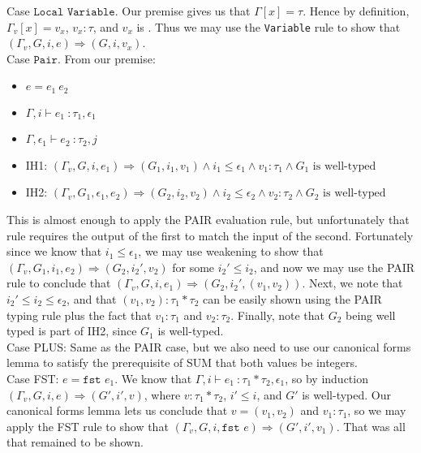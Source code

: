 \documentclass{article}
\begin{document}
Case $\texttt{Local Variable}$. Our premise gives us that $\Gamma[x] = \tau$. Hence by definition, $\Gamma_v[x] = v_x$, $v_x : \tau$, and $v_x$ is \okvalue. Thus we may use the \texttt{Variable} rule to show that $(\Gamma_v, G, i, e) \Rightarrow (G, i, v_x)$.
\\

Case $\texttt{Pair}$. 
From our premise:
\begin{itemize}
	\item $e = e_1\ e_2$
	\item $\Gamma, i \vdash e_1\ \colon \tau_1, \epsilon_1$
	\item $\Gamma, \epsilon_1 \vdash e_2\ \colon \tau_2, j$
	\item IH1: $(\Gamma_v, G, i, e_1) \Rightarrow (G_1, i_1, v_1) \wedge i_1 \leq \epsilon_1 \wedge v_1 : \tau_1 \wedge G_1 \mbox{ is well-typed}$
	\item IH2: $(\Gamma_v, G_1, \epsilon_1, e_2) \Rightarrow (G_2, i_2, v_2) \wedge i_2 \leq \epsilon_2 \wedge v_2 : \tau_2 \wedge G_2 \mbox{ is well-typed}$
\end{itemize}

This is almost enough to apply the PAIR evaluation rule, but unfortunately that rule requires the output of the first to match the input of the second. Fortunately since we know that $i_1 \leq \epsilon_1$, we may use weakening to show that $(\Gamma_v, G_1, i_1, e_2) \Rightarrow (G_2, i_2', v_2)$ for some $i_2' \leq i_2$, and now we may use the PAIR rule to conclude that $(\Gamma_v, G, i, e_1) \Rightarrow (G_2, i_2', (v_1, v_2))$. Next, we note that $i_2' \leq i_2 \leq \epsilon_2$, and that $(v_1, v_2) : \tau_1 * \tau_2$ can be easily shown using the PAIR typing rule plus the fact that $v_1 : \tau_1$ and $v_2 : \tau_2$. Finally, note that $G_2$ being well typed is part of IH2, since $G_1$ is well-typed.
\\

Case PLUS: Same as the PAIR case, but we also need to use our canonical forms lemma to satisfy the prerequisite of SUM that both values be integers.
\\

Case FST: $e = \texttt{fst } e_1$. We know that $\Gamma, i \vdash e_1\ \colon \tau_1 * \tau_2, \epsilon_1$, so by induction $(\Gamma_v, G, i, e) \Rightarrow (G', i', v)$, where $v : \tau_1 * \tau_2$, $i' \leq i$, and $G'$ is well-typed. Our canonical forms lemma lets us conclude that $v = (v_1, v_2)$ and $v_1 : \tau_1$, so we may apply the FST rule to show that $(\Gamma_v, G, i, \texttt{fst } e) \Rightarrow (G', i', v_1)$. That was all that remained to be shown.
\\
\end{document}
